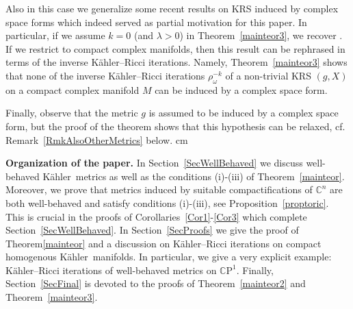 \documentclass[12pt]{amsart}
\newcommand{\CP}{\mathbb{C}\mathrm{P}}
\newcommand{\C}{\mathbb{C}}
\newcommand{\K}{K\"{a}hler}
\begin{document}
Also in this case we generalize some recent results on KRS induced by complex space forms which indeed served as partial motivation for this paper. 
In particular, if we assume $k=0$ (and $\lambda>0$) in Theorem~\ref{mainteor3}, we recover \cite[Theorem~1.1]{LoiMossa21KRSIntoComplexSpaceForms}. 
If we restrict to compact complex manifolds, then this result can be rephrased in terms of the inverse \K--Ricci iterations. 
Namely, Theorem~\ref{mainteor3} shows that none of the inverse \K--Ricci iterations $\rho^{-k}_\omega$ of a non-trivial KRS $(g,X)$ on a compact complex manifold $M$ can be induced by a complex space form.

Finally, observe that the metric $g$ is assumed to be induced by a complex space form, but the proof of the theorem shows that this hypothesis can be relaxed, cf. Remark~\ref{RmkAlsoOtherMetrics} below.
 cm

\noindent\textbf{Organization of the paper.} In Section~\ref{SecWellBehaved} we discuss well-behaved \K\ metrics as well as the conditions (i)-(iii) of Theorem~\ref{mainteor}. 
Moreover, we prove that metrics induced by suitable compactifications of $\C^n$ are both well-behaved and satisfy conditions (i)-(iii), see Proposition~\ref{proptoric}. 
This is crucial in the proofs of Corollaries~\ref{Cor1}-\ref{Cor3} which complete Section~\ref{SecWellBehaved}.
In Section~\ref{SecProofs} we give the proof of Theorem\ref{mainteor} and a discussion on \K--Ricci iterations on compact homogenous \K\ manifolds. 
In particular, we give a very explicit example:  \K--Ricci iterations of well-behaved metrics on $\CP^1$. 
Finally, Section~\ref{SecFinal} is devoted to the proofs of Theorem~\ref{mainteor2} and Theorem~\ref{mainteor3}.
\end{document}
